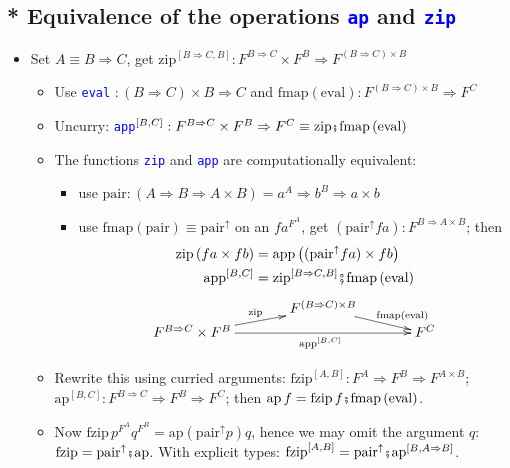 \subsection{{*} Equivalence of the operations \texttt{\textcolor{blue}{\footnotesize{}ap}}
and \texttt{\textcolor{blue}{\footnotesize{}zip}} }
\begin{itemize}
\item \vspace{-0.2cm}Set $A\equiv B\Rightarrow C$, get $\text{zip}^{[B\Rightarrow C,B]}:F^{B\Rightarrow C}\times F^{B}\Rightarrow F^{(B\Rightarrow C)\times B}$
\begin{itemize}
\item Use \texttt{\textcolor{blue}{\footnotesize{}eval}} $:\left(B\Rightarrow C\right)\times B\Rightarrow C$
and $\text{fmap}\left(\text{eval}\right):F^{(B\Rightarrow C)\times B}\Rightarrow F^{C}$
\item Uncurry: \texttt{\textcolor{blue}{\footnotesize{}app}}$\text{}^{[B,C]}:F^{B\Rightarrow C}\times F^{B}\Rightarrow F^{C}\equiv\text{zip}\bef\text{fmap}\left(\text{eval}\right)$ 
\item The functions \texttt{\textcolor{blue}{\footnotesize{}zip}} and \texttt{\textcolor{blue}{\footnotesize{}app}}
are computationally equivalent:
\begin{itemize}
\item use $\text{pair}:\left(A\Rightarrow B\Rightarrow A\times B\right)=a^{A}\Rightarrow b^{B}\Rightarrow a\times b$
\item use $\text{fmap}\left(\text{pair}\right)\equiv\text{pair}^{\uparrow}$
on an $fa^{F^{A}}$, get $(\text{pair}^{\uparrow}fa):F^{B\Rightarrow A\times B}$;
then{\footnotesize{}
\begin{align*}
\text{zip}\left(fa\times fb\right) & =\text{app}\left((\text{pair}^{\uparrow}fa)\times fb\right)\\
\text{app}^{[B,C]} & =\text{zip}^{[B\Rightarrow C,B]}\bef\text{fmap}\left(\text{eval}\right)
\end{align*}
}
\[
\xymatrix{\xyScaleY{0.2pc}\xyScaleX{3pc} & F^{(B\Rightarrow C)\times B}\ar[rd]\sp(0.65){\ \ \text{fmap}\left(\text{eval}\right)}\\
F^{B\Rightarrow C}\times F^{B}\ar[ru]\sp(0.5){\text{zip}}\ar[rr]\sb(0.55){\text{app}^{[B,C]}} &  & F^{C}
}
\]
\end{itemize}
\item Rewrite this using curried arguments: $\text{fzip}^{[A,B]}:F^{A}\Rightarrow F^{B}\Rightarrow F^{A\times B}$;
$\text{ap}^{[B,C]}:F^{B\Rightarrow C}\Rightarrow F^{B}\Rightarrow F^{C}$;
then $\text{ap}\,f=\text{fzip}\,f\bef\text{fmap}\left(\text{eval}\right)$. 
\item Now $\text{fzip}\,p^{F^{A}}q^{F^{B}}=\text{ap}\left(\text{pair}^{\uparrow}p\right)q$,
hence we may omit the argument $q$: $\text{fzip}=\text{pair}^{\uparrow}\bef\text{ap}$.
With explicit types: $\text{fzip}^{[A,B]}=\text{pair}^{\uparrow}\bef\text{ap}^{[B,A\Rightarrow B]}$.
\end{itemize}
\end{itemize}


